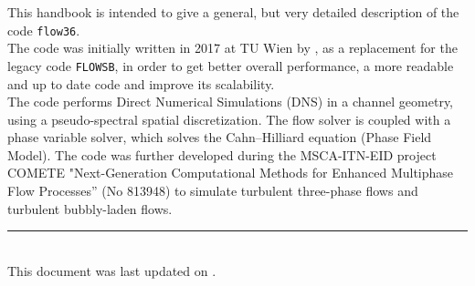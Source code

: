 This handbook is intended to give a general, but very detailed description of the code \texttt{flow36}.\\
The code was initially written in 2017 at TU Wien by \@author, as a replacement for the legacy code \texttt{FLOWSB}, in order to get better overall performance, a more readable and up to date code and improve its scalability.\\
The code performs Direct Numerical Simulations (DNS) in a channel geometry, using a pseudo-spectral spatial discretization. The flow solver is coupled with a phase variable solver, which solves the Cahn--Hilliard equation (Phase Field Model).
The code was further developed during the MSCA-ITN-EID project COMETE "Next-Generation Computational Methods for Enhanced Multiphase Flow Processes” (No 813948) to simulate turbulent three-phase flows and turbulent bubbly-laden flows.


\vfill
\rule{14cm}{0.4pt}\\

This document was last updated on \@date.